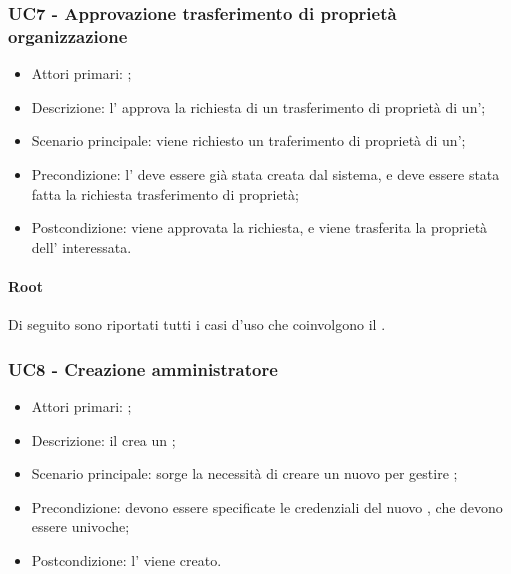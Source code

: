 \documentclass[../analisi-dei-requisiti]{subfiles}
\begin{document}
\subsubsection{UC7 - Approvazione trasferimento di proprietà organizzazione}
\label{subsub:UC7}

\begin{itemize}
\item Attori primari: ;
\item Descrizione: l' approva la richiesta di un trasferimento di proprietà di un';
\item Scenario principale: viene richiesto un traferimento di proprietà di un';
\item Precondizione: l' deve essere già stata creata dal sistema, e deve essere stata fatta la richiesta trasferimento di proprietà;
\item Postcondizione: viene approvata la richiesta, e viene trasferita la proprietà dell' interessata.

\end{itemize}
\paragraph{Root}
Di seguito sono riportati tutti i casi d'uso che coinvolgono il  .

\subsubsection{UC8 - Creazione amministratore}
\label{subsub:UC8}

\begin{itemize}
\item Attori primari: ;
\item Descrizione: il  crea un  ;
\item Scenario principale: sorge la necessità di creare un nuovo  per gestire ;
\item Precondizione: devono essere specificate le credenziali del nuovo , che devono essere univoche;
\item Postcondizione: l' viene creato.

\end{itemize}
\end{document}
